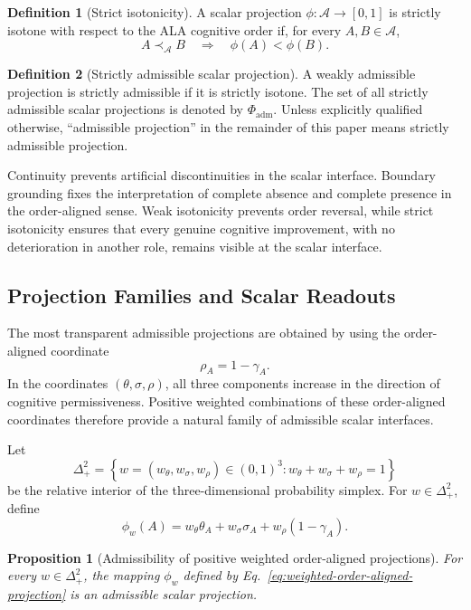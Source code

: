 \documentclass[reqno,final]{amsart}
\theoremstyle{definition}
\newtheorem{definition}{Definition}
\theoremstyle{plain}
\newtheorem{proposition}{Proposition}
\theoremstyle{remark}
\providecommand{\cA}{\mathcal{A}}
\providecommand{\cPhi}{\Phi}
\providecommand{\precA}{\prec_{\mathcal A}}
\begin{document}
\begin{definition}[Strict isotonicity]
A scalar projection \(\phi:\cA\to[0,1]\) is strictly isotone with respect to the ALA cognitive order if, for every \(A,B\in\cA\),
\[
A\precA B
\quad\Longrightarrow\quad
\phi(A)<\phi(B).
\]
\end{definition}

\begin{definition}[Strictly admissible scalar projection]
A weakly admissible projection is strictly admissible if it is strictly isotone. The set of all strictly admissible scalar projections is denoted by \(\cPhi_{\mathrm{adm}}\). Unless explicitly qualified otherwise, ``admissible projection'' in the remainder of this paper means strictly admissible projection.
\end{definition}

Continuity prevents artificial discontinuities in the scalar interface. Boundary grounding fixes the interpretation of complete absence and complete presence in the order-aligned sense. Weak isotonicity prevents order reversal, while strict isotonicity ensures that every genuine cognitive improvement, with no deterioration in another role, remains visible at the scalar interface.

\subsection{Projection Families and Scalar Readouts}
The most transparent admissible projections are obtained by using the order-aligned coordinate
\[
\rho_A=1-\gamma_A.
\]
In the coordinates \((\theta,\sigma,\rho)\), all three components increase in the direction of cognitive permissiveness. Positive weighted combinations of these order-aligned coordinates therefore provide a natural family of admissible scalar interfaces.

Let
\[
\Delta_+^2=\left\{w=(w_\theta,w_\sigma,w_\rho)\in(0,1)^3:
 w_\theta+w_\sigma+w_\rho=1\right\}
\]
be the relative interior of the three-dimensional probability simplex. For \(w\in\Delta_+^2\), define
\begin{equation}
\phi_w(A)
= w_\theta\theta_A+w_\sigma\sigma_A+w_\rho(1-\gamma_A).
\label{eq:weighted-order-aligned-projection}
\end{equation}

\begin{proposition}[Admissibility of positive weighted order-aligned projections]
For every \(w\in\Delta_+^2\), the mapping \(\phi_w\) defined by Eq.~\eqref{eq:weighted-order-aligned-projection} is an admissible scalar projection.
\end{proposition}
\end{document}
